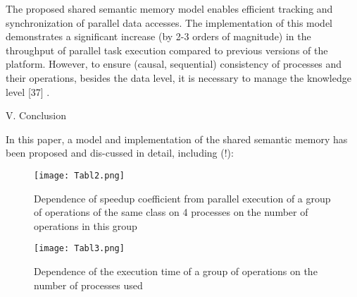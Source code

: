 \documentclass[10pt, a4paper]{article}
\begin{document}
\begin{multicols}{2}
The proposed shared semantic memory model enables
efficient tracking and synchronization of parallel data
accesses. The implementation of this model demonstrates
a significant increase (by 2-3 orders of magnitude) in
the throughput of parallel task execution compared to
previous versions of the platform. However, to ensure
(causal, sequential) consistency of processes and their
operations, besides the data level, it is necessary to
manage the knowledge level [37] .
\begin{center}
V. Conclusion

\end{center}

In this paper, a model and implementation of the
shared semantic memory has been proposed and dis-cussed in detail, including (!):


    \begin{center}
       
    \end{center}
\end{multicols}

 \begin{figure} [H]

        \centering
        \texttt{[image: Tabl2.png]}
        \caption{\footnotesize Dependence of speedup coefficient from parallel execution of a group of operations of the same class on 4 processes on the number
of operations in this group}
    \end{figure}

\begin{figure} [H]

        \centering
        \texttt{[image: Tabl3.png]}
        \begin{center}
           \caption{Dependence of the execution time of a group of operations on the number of processes used} 
        \end{center}
        
    \end{figure}
\newpage
\end{document}
